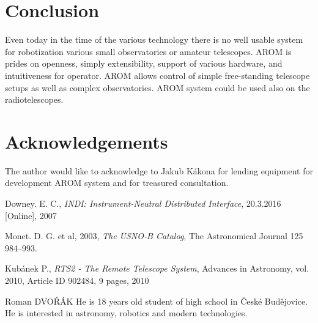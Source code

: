 \documentclass{poster16}
\begin{document}
\section{Conclusion}
Even today in the time of the various technology there is no well usable system for robotization various small observatories or amateur telescopes. AROM is prides on openness, simply extensibility, support of various hardware, and intuitiveness for operator. AROM allows control of simple free-standing telescope setups as well as complex observatories. AROM system could be used also on the radiotelescopes.

\section*{Acknowledgements}
The author would like to acknowledge to Jakub Kákona for lending equipment for development AROM system and for treasured consultation.

\begin{thebibliography}{9}

 Downey. E. C., \emph{INDI: Instrument-Neutral Distributed Interface}, 20.3.2016 [Online], 2007

 Monet. D. G. et al, 2003, \emph{The USNO-B Catalog}, The Astronomical Journal 125 984–993.

\bibitem{} Kubánek P., \emph{RTS2 - The Remote Telescope System}, Advances in Astronomy, vol. 2010, Article ID 902484, 9 pages, 2010

\end{thebibliography}



\begin{authorcv}{Roman DVOŘÁK} He is 18 years old student of high school in České Budějovice. He is interested in astronomy, robotics and modern technologies. 

\end{authorcv}
\end{document}
